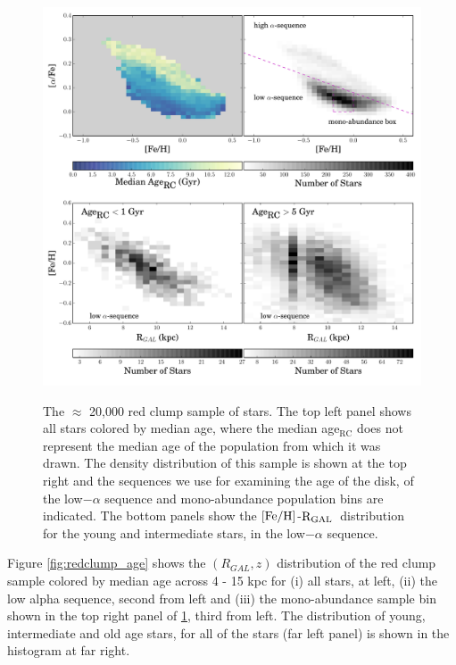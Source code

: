 \documentclass[12pt, preprint]{aastex}
\newcommand{\feh}{\mbox{$\rm [Fe/H]$}}
\newcommand{\rgal}{\mbox{$\rm R_{GAL}$}}
\begin{document}
\begin{figure}[p]
\centering
 \includegraphics[scale=0.5]{./plots/redclump_4panel.pdf}\\
    \caption{The $\approx$ 20,000 red clump sample of stars. The top left panel shows all stars colored by median age, where the median age$_{\mbox{RC}}$ does not represent the median age of the population from which it was drawn. The density distribution of this sample is shown at the top right and the sequences we use for examining the age of the disk, of the low$-\alpha$ sequence and mono-abundance population bins are indicated. The bottom panels show the \feh-\rgal\ distribution for the young and intermediate stars, in the low$-\alpha$ sequence.}
\label{fig:redclump}
\end{figure}

Figure \ref{fig:redclump_age} shows the $(R_{GAL},z)$ distribution of the red clump sample colored by median age across 4 - 15 kpc for  (i) all stars, at left, (ii) the low alpha sequence, second from left and (iii) the mono-abundance sample bin shown in the top right panel of \ref{fig:redclump}, third from left. The distribution of young, intermediate and old age stars, for all of the stars (far left panel) is shown in the histogram at far right. 
\end{document}
